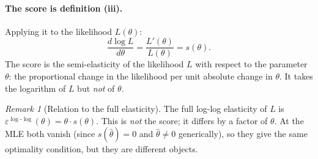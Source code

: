 \documentclass[a4paper,oneside,12pt]{extarticle}
\theoremstyle{plain}
\theoremstyle{definition}
\theoremstyle{remark}
\newtheorem{remark}[proposition]{Remark}
\begin{document}
\paragraph{The score is definition (iii).}
Applying it to the likelihood $L(\theta)$:
\[
  \frac{d\log L}{d\theta}
  = \frac{L'(\theta)}{L(\theta)}
  = s(\theta).
\]
The score is the semi-elasticity of the likelihood $L$ with respect
to the parameter $\theta$: the proportional change in the likelihood
per unit absolute change in $\theta$.  It takes the logarithm of
$L$ but \emph{not} of $\theta$.

\begin{remark}[Relation to the full elasticity]
The full log-log elasticity of $L$ is
$\varepsilon^{\log\text{-}\log}(\theta)
 = \theta\cdot s(\theta)$.
This is \emph{not} the score; it differs by a factor of $\theta$.
At the MLE both vanish (since $s(\hat\theta)=0$ and $\hat\theta\neq 0$
generically), so they give the same optimality condition, but they
are different objects.
\end{remark}
\end{document}
